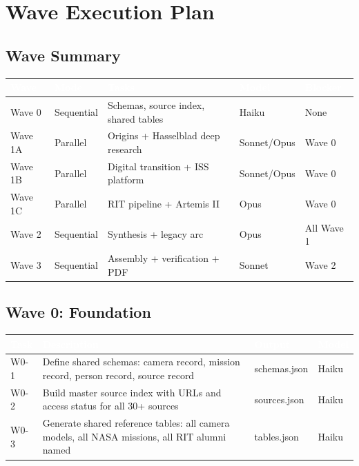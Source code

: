 \documentclass[11pt,letterpaper]{article}
\newcommand{\tableheader}[1]{\textbf{\sffamily\textcolor{white}{#1}}}
\begin{document}
\section{Wave Execution Plan}

\subsection{Wave Summary}

\begin{center}
\begin{tabularx}{\textwidth}{L{1.5cm}L{2cm}L{3cm}C{1.5cm}C{2cm}}
\toprule
{}
\tableheader{Wave} & \tableheader{Mode} & \tableheader{Tasks} & \tableheader{Model} & \tableheader{Blocker} \\
\midrule
Wave 0 & Sequential & Schemas, source index, shared tables & Haiku & None \\
Wave 1A & Parallel & Origins + Hasselblad deep research & Sonnet/Opus & Wave 0 \\
Wave 1B & Parallel & Digital transition + ISS platform & Sonnet/Opus & Wave 0 \\
Wave 1C & Parallel & RIT pipeline + Artemis II & Opus & Wave 0 \\
Wave 2 & Sequential & Synthesis + legacy arc & Opus & All Wave 1 \\
Wave 3 & Sequential & Assembly + verification + PDF & Sonnet & Wave 2 \\
\bottomrule
\end{tabularx}
\end{center}

\subsection{Wave 0: Foundation}

\begin{center}
\begin{tabularx}{\textwidth}{L{1.5cm}XL{2cm}C{1.5cm}}
\toprule
{}
\tableheader{Task} & \tableheader{Description} & \tableheader{Output} & \tableheader{Model} \\
\midrule
W0-1 & Define shared schemas: camera record, mission record, person record, source record & schemas.json & Haiku \\
W0-2 & Build master source index with URLs and access status for all 30+ sources & sources.json & Haiku \\
W0-3 & Generate shared reference tables: all camera models, all NASA missions, all RIT alumni named & tables.json & Haiku \\
\bottomrule
\end{tabularx}
\end{center}
\end{document}
